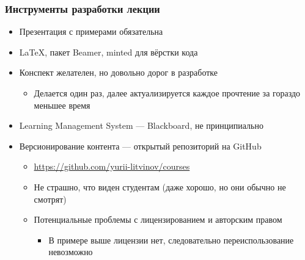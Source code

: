 \documentclass[xetex,mathserif,serif]{beamer}
\begin{document}
    \begin{frame}
        \frametitle{Инструменты разработки лекции}
        \begin{itemize}
            \item Презентация с примерами обязательна
            \item LaTeX, пакет Beamer, minted для вёрстки кода
            \item Конспект желателен, но довольно дорог в разработке 
            \begin{itemize}
                \item Делается один раз, далее актуализируется каждое прочтение за гораздо меньшее время
            \end{itemize}
            \item Learning Management System --- Blackboard, не принципиально
            \item Версионирование контента --- открытый репозиторий на GitHub
            \begin{itemize}
                \item \url{https://github.com/yurii-litvinov/courses}
                \item Не страшно, что виден студентам (даже хорошо, но они обычно не смотрят)
                \item Потенциальные проблемы с лицензированием и авторским правом
                \begin{itemize}
                    \item В примере выше лицензии нет, следовательно переиспользование невозможно
                \end{itemize}
            \end{itemize}
        \end{itemize}
    \end{frame}
\end{document}
